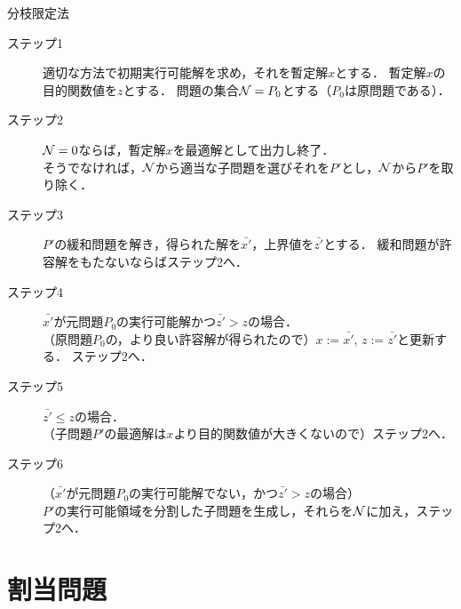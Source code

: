 \begin{itembox}[l]{分枝限定法}
\begin{description}
\item[ステップ1] 適切な方法で初期実行可能解を求め，それを暫定解$x$とする．
暫定解$x$の目的関数値を$z$とする．
問題の集合${\cal N}={P_0}$とする（$P_0$は原問題である）．
\item[ステップ2] ${\cal N}=0$ならば，暫定解$x$を最適解として出力し終了．\\
そうでなければ，${\cal N}$から適当な子問題を選びそれを$P'$とし，${\cal N}$から$P'$を取り除く．
\item[ステップ3] $P'$の緩和問題を解き，得られた解を$\bar{x'}$，上界値を$\bar{z'}$とする．
緩和問題が許容解をもたないならばステップ2へ．
\item[ステップ4] $\bar{x'}$が元問題$P_0$の実行可能解かつ$\bar{z'}>z$の場合．\\
（原問題$P_0$の，より良い許容解が得られたので）$x:=\bar{x'}$,  $z:=\bar{z'}$と更新する．
ステップ2へ．
\item[ステップ5] $\bar{z'} \leq z$の場合．\\
（子問題$P'$の最適解は$x$より目的関数値が大きくないので）ステップ2へ．
\item[ステップ6] （$\bar{x'}$が元問題$P_0$の実行可能解でない，かつ$\bar{z'} > z$の場合）\\
$P'$の実行可能領域を分割した子問題を生成し，それらを${\cal N}$に加え，ステップ2へ．
\end{description}
\end{itembox}


\section{割当問題}

